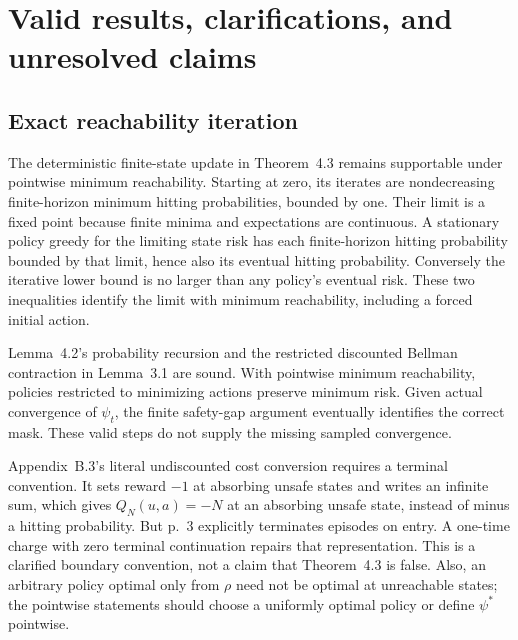 \documentclass[10pt]{article}
\begin{document}
\section*{Valid results, clarifications, and unresolved claims}
\subsection*{Exact reachability iteration}
The deterministic finite-state update in Theorem 4.3 remains supportable under pointwise minimum reachability. Starting at zero, its iterates are nondecreasing finite-horizon minimum hitting probabilities, bounded by one. Their limit is a fixed point because finite minima and expectations are continuous. A stationary policy greedy for the limiting state risk has each finite-horizon hitting probability bounded by that limit, hence also its eventual hitting probability. Conversely the iterative lower bound is no larger than any policy’s eventual risk. These two inequalities identify the limit with minimum reachability, including a forced initial action.\par
Lemma 4.2’s probability recursion and the restricted discounted Bellman contraction in Lemma 3.1 are sound. With pointwise minimum reachability, policies restricted to minimizing actions preserve minimum risk. Given actual convergence of \(\psi_t\), the finite safety-gap argument eventually identifies the correct mask. These valid steps do not supply the missing sampled convergence.\par
Appendix B.3’s literal undiscounted cost conversion requires a terminal convention. It sets reward \(-1\) at absorbing unsafe states and writes an infinite sum, which gives \(Q_N(u,a)=-N\) at an absorbing unsafe state, instead of minus a hitting probability. But p. 3 explicitly terminates episodes on entry. A one-time charge with zero terminal continuation repairs that representation. This is a clarified boundary convention, not a claim that Theorem 4.3 is false. Also, an arbitrary policy optimal only from \(\rho\) need not be optimal at unreachable states; the pointwise statements should choose a uniformly optimal policy or define \(\psi^*\) pointwise.\par
\end{document}
